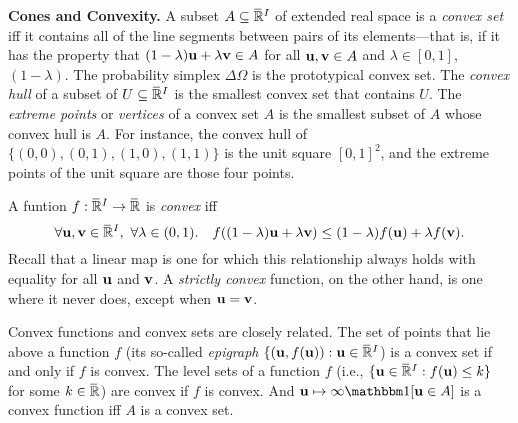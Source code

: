 
\textbf{Cones and Convexity.}
A subset $A \subseteq \mskip1mu\overline{\mskip-1mu\mathbb R\!}\,^I$ of extended real space is a \emph{convex set} iff
it contains all of the line segments between pairs of its elements---that is, if
it has the property that
$
(1-\lambda) \mathbf u + \lambda \mathbf v \in A
$
for all $\mathbf u, \mathbf v \in A$ and $\lambda \in [0,1]$,
$(1-\lambda)$.
The probability simplex $\Delta \Omega$ is the prototypical convex set. 
The \emph{convex hull} of a subset of $U \subseteq \mskip1mu\overline{\mskip-1mu\mathbb R\!}\,^I$ is the smallest convex set that contains $U$. 
The \emph{extreme points} or \emph{vertices} of a convex set $A$ is the smallest subset 
of $A$ whose convex hull is $A$. 
For instance, the convex hull of $\{ (0,0), (0,1), (1,0), (1,1) \}$
is the unit square $[0,1]^2$, and the extreme points of the unit square are those four points. 

%
A funtion $f : \mskip1mu\overline{\mskip-1mu\mathbb R\!}\,^I \to \mskip1mu\overline{\mskip-1mu\mathbb R\!}\,$ is \emph{convex} iff
\[
    \forall \mathbf u, \mathbf v \in \mskip1mu\overline{\mskip-1mu\mathbb R\!}\,^I,~\forall \lambda \in (0,1).\quad
    f( (1-\lambda) \mathbf u + \lambda \mathbf v ) \le (1-\lambda) f(\mathbf u) + \lambda f(\mathbf v).
\]
Recall that a linear map is one for which this relationship always holds with equality for all $\mathbf u$ and $\mathbf v$. 
A \emph{strictly convex} function, on the other hand, is one where it never does, except when $\mathbf u = \mathbf v$. 

Convex functions and convex sets are closely related. The set of points that lie above a function $f$
 (its so-called \emph{epigraph} $\{ (\mathbf u, f(\mathbf u)) : \mathbf u \in \mskip1mu\overline{\mskip-1mu\mathbb R\!}\,^I$) 
is a convex set if and only if $f$ is convex. The level sets of a function $f$ (i.e., $\{ \mathbf u \in \mskip1mu\overline{\mskip-1mu\mathbb R\!}\,^I : f(\mathbf u) \le k \}$ for some $k \in \mskip1mu\overline{\mskip-1mu\mathbb R\!}\,$) are convex if $f$ is convex. And $\mat u \mapsto \infty \mathbbm 1[\mat u \in A]$ is a convex function iff $A$ is a convex set. 




\paragraph{}

